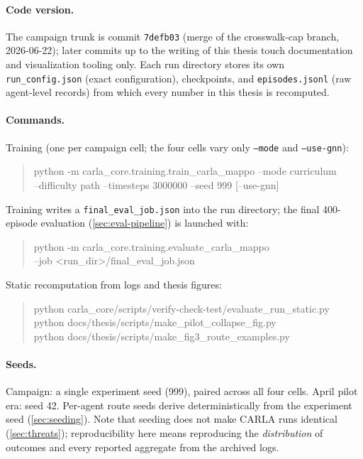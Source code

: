 \paragraph{Code version.}
The campaign trunk is commit \texttt{7defb03} (merge of the crosswalk-cap
branch, 2026-06-22); later commits up to the writing of this thesis touch
documentation and visualization tooling only. Each run directory stores
its own \texttt{run\_config.json} (exact configuration), checkpoints, and
\texttt{episodes.jsonl} (raw agent-level records) from which every number
in this thesis is recomputed.

\paragraph{Commands.}
Training (one per campaign cell; the four cells vary only
\texttt{--mode} and \texttt{--use-gnn}):
\begin{quote}\small\ttfamily
python -m carla\_core.training.train\_carla\_mappo --mode curriculum\\
\hspace*{2em}--difficulty path --timesteps 3000000 --seed 999 [--use-gnn]
\end{quote}
Training writes a \texttt{final\_eval\_job.json} into the run directory;
the final 400-episode evaluation (\cref{sec:eval-pipeline}) is launched
with:
\begin{quote}\small\ttfamily
python -m carla\_core.training.evaluate\_carla\_mappo\\
\hspace*{2em}--job <run\_dir>/final\_eval\_job.json
\end{quote}
Static recomputation from logs and thesis figures:
\begin{quote}\small\ttfamily
python carla\_core/scripts/verify-check-test/evaluate\_run\_static.py \\
python docs/thesis/scripts/make\_pilot\_collapse\_fig.py \\
python docs/thesis/scripts/make\_fig3\_route\_examples.py
\end{quote}

\paragraph{Seeds.}
Campaign: a single experiment seed (999), paired across all four cells.
April pilot era: seed 42. Per-agent route seeds derive
deterministically from the experiment seed (\cref{sec:seeding}). Note
that seeding does not make CARLA runs identical (\cref{sec:threats});
reproducibility here means reproducing the \emph{distribution} of
outcomes and every reported aggregate from the archived logs.
